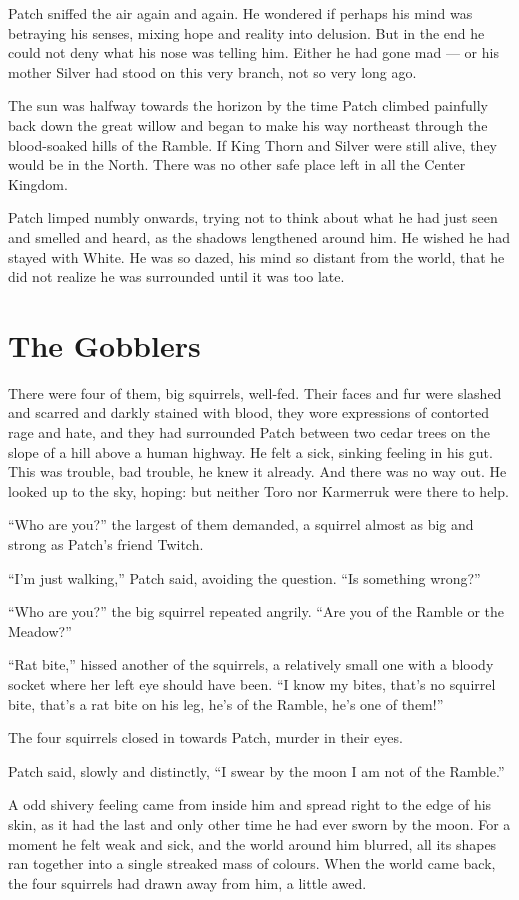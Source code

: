 \documentclass[ebook,oneside,openany,17pt]{memoir}
\renewcommand{\thechapter}{\Roman{chapter}}
\newcounter{sections}
\newcommand{\sections}[1]{%
  \section*{#1}
  \addtocounter{sections}{1}%
  \pdfbookmark[1]{#1}{section.\thechapter.\thesections}}
\begin{document}
Patch sniffed the air again and again. He wondered if perhaps his mind
was betraying his senses, mixing hope and reality into delusion. But
in the end he could not deny what his nose was telling him. Either he
had gone mad — or his mother Silver had stood on this very branch, not
so very long ago.

The sun was halfway towards the horizon by the time Patch climbed
painfully back down the great willow and began to make his way
northeast through the blood-soaked hills of the Ramble. If King Thorn
and Silver were still alive, they would be in the North. There was no
other safe place left in all the Center Kingdom.

Patch limped numbly onwards, trying not to think about what he had
just seen and smelled and heard, as the shadows lengthened around
him. He wished he had stayed with White. He was so dazed, his mind so
distant from the world, that he did not realize he was surrounded
until it was too late.


\sections{The Gobblers}

There were four of them, big squirrels, well-fed. Their faces and fur
were slashed and scarred and darkly stained with blood, they wore
expressions of contorted rage and hate, and they had surrounded Patch
between two cedar trees on the slope of a hill above a human
highway. He felt a sick, sinking feeling in his gut. This was trouble,
bad trouble, he knew it already. And there was no way out. He looked
up to the sky, hoping: but neither Toro nor Karmerruk were there to
help.

“Who are you?” the largest of them demanded, a squirrel almost as big
and strong as Patch’s friend Twitch.

“I’m just walking,” Patch said, avoiding the question. “Is something
wrong?”

“Who are you?” the big squirrel repeated angrily. “Are you of the
Ramble or the Meadow?”

“Rat bite,” hissed another of the squirrels, a relatively small one
with a bloody socket where her left eye should have been. “I know my
bites, that’s no squirrel bite, that’s a rat bite on his leg, he’s of
the Ramble, he’s one of them!”

The four squirrels closed in towards Patch, murder in their eyes.

Patch said, slowly and distinctly, “I swear by the moon I am not of
the Ramble.”

A odd shivery feeling came from inside him and spread right to the
edge of his skin, as it had the last and only other time he had ever
sworn by the moon. For a moment he felt weak and sick, and the world
around him blurred, all its shapes ran together into a single streaked
mass of colours. When the world came back, the four squirrels had
drawn away from him, a little awed.
\end{document}
